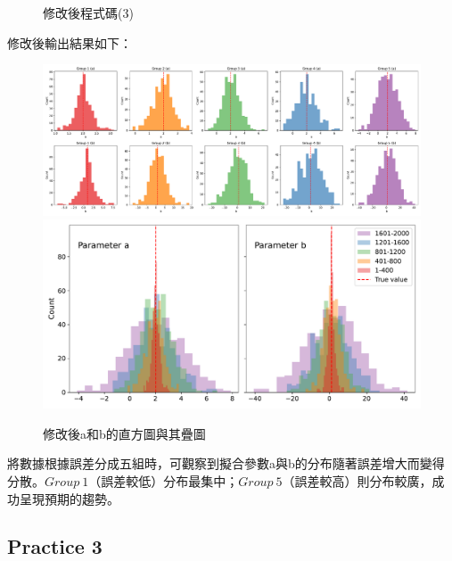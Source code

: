 \documentclass[12pt,a4paper]{article}
\begin{document}
\begin{CJK}{UTF8}{bkai}
\begin{itemize}
\begin{figure}[h]
        \caption{修改後程式碼(3)}
        \label{fig:practice_2_revise3}
    \end{figure}
    \clearpage
    修改後輸出結果如下：
\begin{figure}[h]
    \centering
    \includegraphics[width=1\linewidth]{figures/output/practice_2/output2_1_revise.pdf}
    \includegraphics[width=1\linewidth]{figures/output/practice_2/output2_2_revise.pdf}
    \caption{修改後a和b的直方圖與其疊圖}
    \label{fig:practice_2_revise1}
\end{figure}
\end{itemize}

將數據根據誤差分成五組時，可觀察到擬合參數a與b的分布隨著誤差增大而變得分散。$Group\ 1$（誤差較低）分布最集中；$Group\ 5$（誤差較高）則分布較廣，成功呈現預期的趨勢。

\clearpage
\subsection{Practice 3}
\hfill


\end{CJK}
\end{document}
